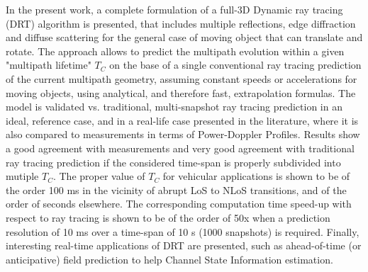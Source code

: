 In the present work, a complete formulation of a full-3D Dynamic ray tracing (DRT) algorithm is presented, that includes multiple reflections, edge diffraction and diffuse scattering for the general case of moving object that can translate and rotate. The approach allows to predict the multipath evolution within a given "multipath lifetime" $T_C$ on the base of a single conventional ray tracing prediction of the current multipath geometry, assuming constant speeds or accelerations for moving objects, using analytical, and therefore fast, extrapolation formulas.
The model is validated vs. traditional, multi-snapshot ray tracing prediction in an ideal, reference case, and in a real-life case presented in the literature, where it is also compared to measurements in terms of Power-Doppler Profiles. Results show a good agreement with measurements and very good agreement with traditional ray tracing prediction if the considered time-span is properly subdivided into mutiple $T_C$. The proper value of $T_C$ for vehicular applications is shown to be of the order 100 ms in the vicinity of abrupt LoS to NLoS transitions, and of the order of seconds elsewhere. The corresponding computation time speed-up with respect to ray tracing is shown to be of the order of 50x when a prediction resolution of 10 ms over a time-span of 10 s (1000 snapshots) is required.
Finally, interesting real-time applications of DRT are presented, such as ahead-of-time (or anticipative) field prediction to help Channel State Information estimation.